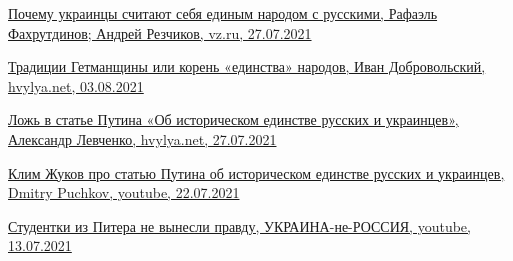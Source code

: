 \href{https://vz.ru/world/2021/7/27/1111068.html}{%
Почему украинцы считают себя единым народом с русскими, Рафаэль Фахрутдинов; Андрей Резчиков, vz.ru, 27.07.2021%
%
}

\href{https://analytics.hvylya.net/235008-tradicii-getmanshchiny-ili-koren-edinstva-narodov}{%
Традиции Гетманщины или корень «единства» народов, Иван Добровольский, hvylya.net, 03.08.2021%
}

\href{https://analytics.hvylya.net/234552-lozh-v-state-putina-o-istoricheskom-edinstve-russkih-i-ukraincev}{%
Ложь в статье Путина «Об историческом единстве русских и украинцев», Александр Левченко, hvylya.net, 27.07.2021%
}

\href{https://www.youtube.com/watch?v=QnS-8kiyPUw}{%
Клим Жуков про статью Путина об историческом единстве русских и украинцев, Dmitry Puchkov,  youtube, 22.07.2021%
}

\href{https://www.youtube.com/watch?v=Bfu53UbqJf8}{%
Студентки из Питера не вынесли правду, УКРАИНА-не-РОССИЯ, youtube, 13.07.2021%
}
